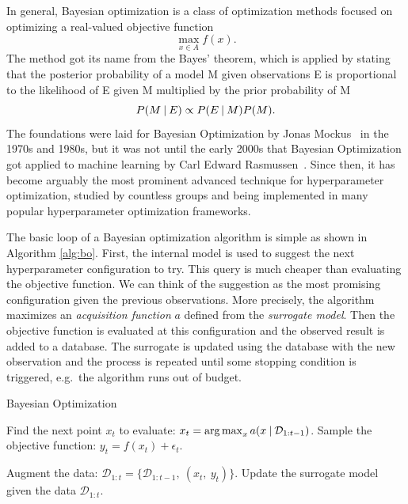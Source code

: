 In general, Bayesian optimization is a class of optimization methods focused on optimizing a real-valued objective function \[ \max_{x\in A} f(x). \] The method got its name from the Bayes' theorem, which is applied by stating that the posterior probability of a model M given observations E is proportional to the likelihood of E given M multiplied by the prior probability of M \[ P(M \:\vert\: E) \propto P(E \:\vert\: M)P(M).\] The foundations were laid for Bayesian Optimization by Jonas Mockus~\cite{mockus1974bayesian} in the 1970s and 1980s, but it was not until the early 2000s that Bayesian Optimization got applied to machine learning by Carl Edward Rasmussen~\cite{rasmussen2006gaussian}. Since then, it has become arguably the most prominent advanced technique for hyperparameter optimization, studied by countless groups and being implemented in many popular hyperparameter optimization frameworks.

The basic loop of a Bayesian optimization algorithm is simple as shown in Algorithm \ref{alg:bo}. First, the internal model is used to suggest the next hyperparameter configuration to try. This query is much cheaper than evaluating the objective function. We can think of the suggestion as the most promising configuration given the previous observations. More precisely, the algorithm maximizes an \textit{acquisition function} $a$ defined from the \textit{surrogate model}. Then the objective function is evaluated at this configuration and the observed result is added to a database. The surrogate is updated using the database with the new observation and the process is repeated until some stopping condition is triggered, e.g.\ the algorithm runs out of budget.


\begin{algorithm}
    \caption{Bayesian Optimization}
    \begin{algorithmic}[1]
        \State Find the next point $x_t$ to evaluate: $x_t = \operatorname*{arg\,max}_{x} a(x \:\vert\: \mathcal{D}_{1:t-1})$.
        \State Sample the objective function:  $y_t = f(x_t)+ \epsilon_t$.

        \State Augment the data: $\mathcal{D}_{1:t}= \{\mathcal{D}_{1:t-1}, \: (x_t, \: y_t)\}$.
        \State Update the surrogate model given the data $\mathcal{D}_{1:t}$.
    \EndFor
    \end{algorithmic}
    \label{alg:bo}
\end{algorithm}

